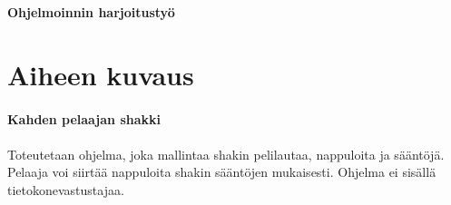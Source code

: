 \documentclass[12pt]{article}
\begin{document}
\Huge{\bf{Ohjelmoinnin harjoitustyö}}

\normalsize

\section{Aiheen kuvaus}

\paragraph{Kahden pelaajan shakki}

\paragraph{} Toteutetaan ohjelma, joka mallintaa shakin pelilautaa, nappuloita ja sääntöjä. Pelaaja voi siirtää nappuloita shakin sääntöjen mukaisesti. Ohjelma ei sisällä tietokonevastustajaa.
\end{document}
